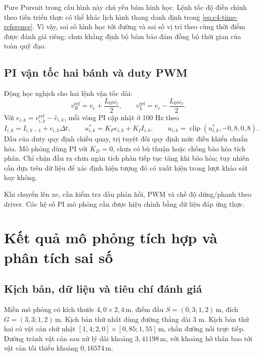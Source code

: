 \documentclass[12pt,a4paper,oneside]{report}
\begin{document}
Pure Pursuit trong cấu hình này chủ yếu bám hình học. Lệnh tốc độ điều chỉnh theo tiến triển thực có thể khác lịch hình thang danh định trong \eqref{eq:c4-time-reference}. Vì vậy, sai số hình học tới đường và sai số vị trí theo cùng thời điểm được đánh giá riêng; chưa khẳng định bộ bám bảo đảm đồng bộ thời gian của toàn quỹ đạo.

\subsection{PI vận tốc hai bánh và duty PWM}

Động học nghịch cho hai lệnh vận tốc dài:
\begin{equation}
  v_R^{\mathrm{ref}}=v_c+\frac{L_0\omega_c}{2},\qquad
  v_L^{\mathrm{ref}}=v_c-\frac{L_0\omega_c}{2}.
  \label{eq:c4-wheel-references}
\end{equation}
Với \(e_{i,k}=v_{i,k}^{\mathrm{ref}}-\widehat v_{i,k}\), mỗi vòng PI cập nhật ở 100 Hz theo
\begin{equation}
  I_{i,k}=I_{i,k-1}+e_{i,k}\Delta t,\qquad
  u_{i,k}^{*}=K_Pe_{i,k}+K_II_{i,k},\qquad
  u_{i,k}=\operatorname{clip}(u_{i,k}^{*},-0{,}8,0{,}8).
  \label{eq:c4-pi}
\end{equation}
Dấu của duty quy định chiều quay, trị tuyệt đối quy định mức điều khiển chuẩn hóa. Mô phỏng dùng PI với \(K_D=0\), chưa có bù thuận hoặc chống bão hòa tích phân. Chỉ chặn đầu ra chưa ngăn tích phân tiếp tục tăng khi bão hòa; tuy nhiên cần dựa trên dữ liệu để xác định hiện tượng đó có xuất hiện trong lượt khảo sát hay không.

Khi chuyển lên xe, cần kiểm tra dấu phản hồi, PWM và chế độ dừng/phanh theo driver. Các hệ số PI mô phỏng cần được hiệu chỉnh bằng dữ liệu đáp ứng thực.

\clearpage
\section{Kết quả mô phỏng tích hợp và phân tích sai số}

\subsection{Kịch bản, dữ liệu và tiêu chí đánh giá}

Miền mô phỏng có kích thước \(4{,}0\times2{,}4\,\mathrm{m}\), điểm đầu \(S=(0{,}3;1{,}2)\,\mathrm{m}\), đích \(G=(3{,}3;1{,}2)\,\mathrm{m}\). Kịch bản thứ nhất dùng đường thẳng dài 3 m. Kịch bản thứ hai có vật cản chữ nhật \([1{,}4;2{,}0]\times[0{,}85;1{,}55]\,\mathrm{m}\), chắn đường nối trực tiếp. Đường tránh vật cản sau xử lý dài khoảng \(3{,}41198\,\mathrm{m}\), với khoảng hở thân bao tới vật cản tối thiểu khoảng \(0{,}16574\,\mathrm{m}\).
\end{document}
